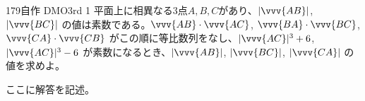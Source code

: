 \begin{prob}{179}{}{自作 DMO3rd 1}
 平面上に相異なる3点$A, B, C$があり、$|\vvv{AB}|$, $|\vvv{BC}|$ の値は素数である。$\vvv{AB}\cdot\vvv{AC}$, $\vvv{BA}\cdot\vvv{BC}$, $\vvv{CA}\cdot\vvv{CB}$ がこの順に等比数列をなし、$|\vvv{AC}|^3+6$, $|\vvv{AC}|^3-6$ が素数になるとき、$|\vvv{AB}|$, $|\vvv{BC}|$, $|\vvv{CA}|$ の値を求めよ。
\end{prob}
ここに解答を記述。